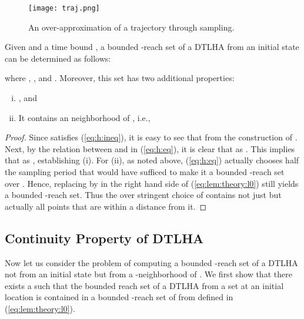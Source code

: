 \begin{figure}
\begin{center}
	\texttt{[image: traj.png]}
	\caption{An over-approximation of a trajectory  through sampling.}\label{fig:traj}
\end{center}
\end{figure}



\begin{lem} \label{lem:theory:l0}
Given  and a time bound , a bounded -reach set  of a DTLHA  from an initial state  can be determined as follows:

where , ,  and .
Moreover, this set has two additional properties:
\begin{enumerate}[(i)]
    \item , and
    \item It contains an  neighborhood of , i.e.,
    
\end{enumerate}
\end{lem}
\begin{proof}
Since  satisfies (\ref{eq:h:ineq}), it is easy to see that  from the construction of .
Next, by the relation between  and  in (\ref{eq:h:eq}), it is clear that  as . 
This implies that  as , establishing (i). 
For (ii), as noted above, (\ref{eq:h:eq}) actually chooses half the sampling period that would have sufficed to make it a bounded -reach set over . 
Hence, replacing  by  in the right hand side of (\ref{eq:lem:theory:l0}) still yields a bounded -reach set. 
Thus the over stringent choice of  contains not just  but actually all points that are within a distance  from it.
\end{proof}




\subsection{Continuity Property of DTLHA}  \label{sec:theory:cont}

Now let us consider the problem of computing a bounded -reach set of a DTLHA  not from an initial state  but from a -neighborhood of .
We first show that there exists a  such that the bounded reach set of a DTLHA  from a set  at an initial location  is contained in a bounded -reach set of  from  defined in (\ref{eq:lem:theory:l0}).


